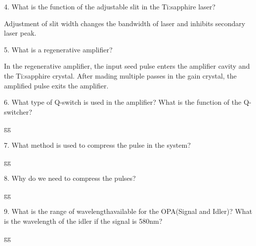 \documentclass{article}
\begin{document}
4. What is the function of the adjustable slit in the Ti:sapphire laser?
\par 
Adjustment of slit width changes the bandwidth of laser and inhibits secondary laser peak. \\
\par 
5. What is a regenerative amplifier?
\par 
In the regenerative amplifier, the input seed pulse enters the amplifier cavity and the Ti:sapphire crystal. After mading multiple passes in the gain crystal, the amplified pulse exits the amplifier.\\
\par 
6. What type of Q-switch is used in the amplifier? What is the function of the Q-switcher?
\par 
gg\\
\par 
7. What method is used to compress the pulse in the system?
\par 
gg\\
\par 
8. Why do we need to compress the pulses?
\par 
gg\\
\par 
9. What is the range of wavelengthavailable for the OPA(Signal and Idler)? What is the wavelength of the idler if the signal is 580nm?
\par 
gg\\
\par 
\end{document}
